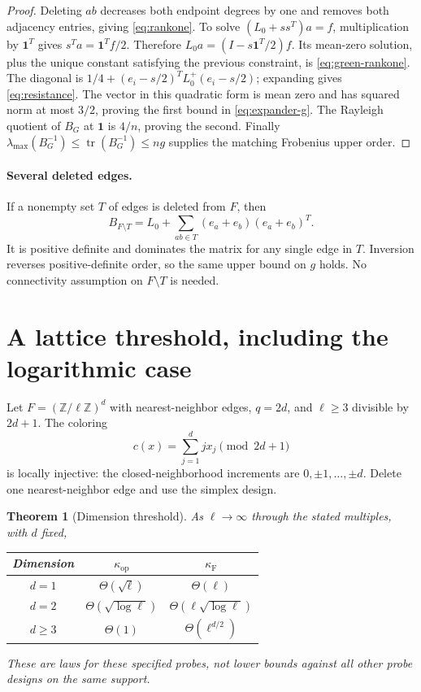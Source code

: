 \documentclass[11pt]{article}
\newtheorem{theorem}{Theorem}[section]
\theoremstyle{remark}\newtheorem{remark}[theorem]{Remark}
\newcommand{\one}{\mathbf 1}
\newcommand{\op}{\mathrm{op}}
\newcommand{\F}{\mathrm F}
\newcommand{\tr}{\operatorname{tr}}
\begin{document}
\begin{proof}
Deleting $ab$ decreases both endpoint degrees by one and removes both adjacency entries, giving \eqref{eq:rankone}. To solve $(L_0+ss^T)a=f$, multiplication by $\one^T$ gives $s^Ta=\one^Tf/2$. Therefore
$L_0a=(I-s\one^T/2)f$. Its mean-zero solution, plus the unique constant satisfying the previous constraint, is \eqref{eq:green-rankone}.
The diagonal is $1/4+(e_i-s/2)^TL_0^+(e_i-s/2)$; expanding gives \eqref{eq:resistance}. The vector in this quadratic form is mean zero and has squared norm at most $3/2$, proving the first bound in \eqref{eq:expander-g}. The Rayleigh quotient of $B_G$ at $\one$ is $4/n$, proving the second. Finally $\lambda_{\max}(B_G^{-1})\leq\tr(B_G^{-1})\leq ng$ supplies the matching Frobenius upper order.
\end{proof}

\paragraph{Several deleted edges.}
If a nonempty set $T$ of edges is deleted from $F$, then
\begin{equation}\label{eq:multiground}
B_{F\setminus T}=L_0+\sum_{ab\in T}(e_a+e_b)(e_a+e_b)^T.
\end{equation}
It is positive definite and dominates the matrix for any single edge in $T$. Inversion reverses positive-definite order, so the same upper bound on $g$ holds. No connectivity assumption on $F\setminus T$ is needed.

\section{A lattice threshold, including the logarithmic case}

Let $F=(\mathbb Z/\ell\mathbb Z)^d$ with nearest-neighbor edges, $q=2d$, and
$\ell\geq3$ divisible by $2d+1$. The coloring
\[
c(x)=\sum_{j=1}^d jx_j\pmod{2d+1}
\]
is locally injective: the closed-neighborhood increments are $0,\pm1,\ldots,\pm d$. Delete one nearest-neighbor edge and use the simplex design.

\begin{theorem}[Dimension threshold]\label{thm:torus}
As $\ell\to\infty$ through the stated multiples, with $d$ fixed,
\begin{center}
\begin{tabular}{ccc}\toprule
Dimension & $\kappa_{\op}$ & $\kappa_{\F}$\\\midrule
$d=1$ & $\Theta(\sqrt\ell)$ & $\Theta(\ell)$\\
$d=2$ & $\Theta(\sqrt{\log\ell})$ & $\Theta(\ell\sqrt{\log\ell})$\\
$d\geq3$ & $\Theta(1)$ & $\Theta(\ell^{d/2})$\\\bottomrule
\end{tabular}
\end{center}
These are laws for these specified probes, not lower bounds against all other probe designs on the same support.
\end{theorem}
\end{document}

